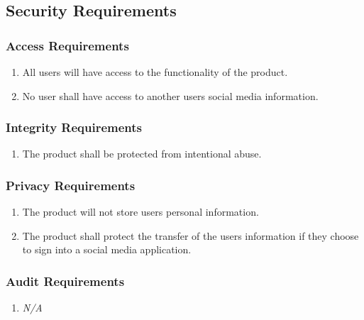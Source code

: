 \documentclass[]{article}
\begin{document}

\subsection{Security Requirements}
\label{sub:security_requirements}

\subsubsection{Access Requirements}
\label{ssub:access_requirements}
\begin{enumerate}[{SR}1. ]
	\item All users will have access to the functionality of the product.
	\item No user shall have access to another users social media information.
\end{enumerate}

\subsubsection{Integrity Requirements}
\label{ssub:integrity_requirements}
\begin{enumerate}[{SR}1. ]
	\item The product shall be protected from intentional abuse.
\end{enumerate}

\subsubsection{Privacy Requirements}
\label{ssub:privacy_requirements}
\begin{enumerate}[{SR}1. ]
	\item The product will not store users personal information.
	\item The product shall protect the transfer of the users information if they choose to sign into a social media 
	application.
\end{enumerate}

\subsubsection{Audit Requirements}
\label{ssub:audit_requirements}
\begin{enumerate}[{SR}1. ]
	\item \emph{N/A}
\end{enumerate}
\end{document}
